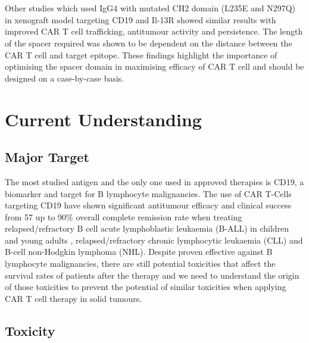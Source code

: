 \documentclass[12pt,oneside]{report}
\begin{document}
\\\\Other studies which used IgG4 with mutated CH2 domain (L235E and N297Q) in xenograft model targeting CD19\citep{hinge-4} and Il-13R\citep{hinge-5} showed similar results with improved CAR T cell trafficking, antitumour activity and persistence. The length of the spacer required was shown to be dependent on the distance between the CAR T cell and target epitope\citep{hinge-6}. These findings highlight the importance of optimising the spacer domain in maximising efficacy of CAR T cell and should be designed on a case-by-case basis. 

\section{Current Understanding}
\subsection{Major Target}
The most studied antigen and the only one used in approved therapies is CD19, a biomarker and target for B lymphocyte malignancies. The use of CAR T-Cells targeting CD19 have shown significant antitumour efficacy and clinical success from 57 up to 90\% overall complete remission rate when treating relapsed/refractory B cell acute lymphoblastic leukaemia (B-ALL) in children and young adults \citep{ALL, ALL2, acute, acute2}, relapsed/refractory chronic lymphocytic leukaemia (CLL)\citep{chronic} and B-cell non-Hodgkin lymphoma (NHL)\citep{lymphoma}. Despite proven effective against B lymphocyte malignancies, there are still potential toxicities that affect the survival rates of patients after the therapy and we need to understand the origin of those toxicities to prevent the potential of similar toxicities when applying CAR T cell therapy in solid tumours.

\subsection{Toxicity}
\end{document}
